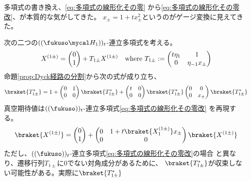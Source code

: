 {	\begin{todo}[妄想あるいは]\label{todo:妄想あるいは} %
		多項式の書き換え、\eqref{eq:多項式の線形化その零}
		から\eqref{eq:多項式の線形化その零改}、が本質的な気がしてきた。
		$x_\pm=1+tx_\pm^2$というのがゲージ変換に見えてきた。
	\end{todo} %

	次の二つの$((\fukuso\Eta_1))_t$-連立多項式を考える。
	\begin{equation}\label{eq:多項式の線形化その一}\begin{split}
		X^{(1\pm)} = \begin{pmatrix}{0}\\{1}\end{pmatrix} + T_{1\pm}X^{(1\pm)} 
		\quad\text{where } T_{1\pm} := \begin{pmatrix}
			t\eta_1 & 1 \\ 0 & \eta_{-1}x_\pm
		\end{pmatrix}
	\end{split}\end{equation}
	命題\ref{prop:Dyck経路の分割}から次の式が成り立ち、
	\begin{equation*}\begin{split}
		\braket{T_{1\pm}^*} = 1 + \begin{pmatrix}
			0 & 1 \\ 0 & 0
		\end{pmatrix}\braket{T_{1\pm}^*} + \begin{pmatrix}
			t & 0 \\ 0 & 0
		\end{pmatrix}\braket{T_{1\pm}^*}\begin{pmatrix}
			0 & 0 \\ 0 & x_\pm
		\end{pmatrix}\braket{T_{1\pm}^*}
	\end{split}\end{equation*}
	真空期待値は$((\fukuso))_t$-連立多項式\eqref{eq:多項式の線形化その零改}
	を再現する。
	\begin{equation*}\begin{split}
		\braket{X^{(1\pm)}} = \pvec{0}{1} + \begin{pmatrix}
			0 & 1 + t\braket{X^{(1\pm)}_1}x_\pm \\ 0 & 0
		\end{pmatrix} \braket{X^{(1\pm)}}
	\end{split}\end{equation*}
	ただし、$((\fukuso))_t$-連立多項式\eqref{eq:多項式の線形化その零改}の場合
	と異なり、遷移行列$T_{1\pm}$に$0$でない対角成分があるために、
	$\braket{T_{1\pm}^*}$が収束しない可能性がある。実際に$\braket{T_{1\pm}^*}$
}
